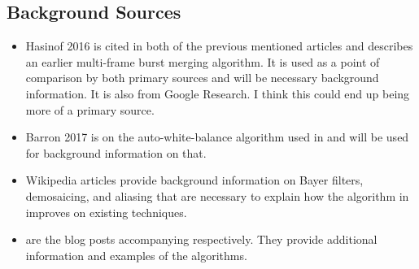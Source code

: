 \documentclass{sig-alternate}
\begin{document}
\subsection{Background Sources}
\begin{itemize}
\item Hasinof 2016 \cite{Hasinoff2016} is cited in both of the previous mentioned articles and describes an earlier multi-frame burst merging algorithm. It is used as a point of comparison by both primary sources and will be necessary background information. It is also from Google Research. I think this could end up being more of a primary source.
\item Barron 2017 \cite{Barron2017} is on the auto-white-balance algorithm used in \cite{Liba2019} and will be used for background information on that.
\item Wikipedia articles \cite{wiki:BayerFilter, wiki:Demosaicing, wiki:Aliasing} provide background information on Bayer filters, demosaicing, and aliasing that are necessary to explain how the algorithm in \cite{Wronski2019} improves on existing techniques.

\item \cite{blog:Wronski2018, blog:Levoy2018} are the blog posts accompanying \cite{Wronski2019, Liba2019} respectively. They provide additional information and examples of the algorithms.

\end{itemize}

  

\end{document}
